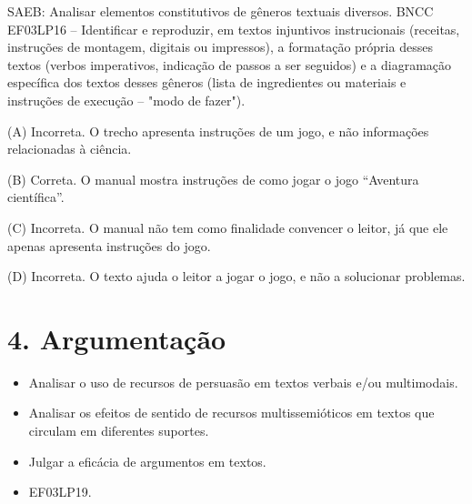 SAEB: Analisar elementos constitutivos de gêneros textuais diversos.
BNCC EF03LP16 -- Identificar e reproduzir, em textos injuntivos
instrucionais (receitas, instruções de montagem, digitais ou impressos),
a formatação própria desses textos (verbos imperativos, indicação de
passos a ser seguidos) e a diagramação específica dos textos desses
gêneros (lista de ingredientes ou materiais e instruções de execução --
"modo de fazer").

(A) Incorreta. O trecho apresenta instruções de um jogo, e não
informações relacionadas à ciência.

(B) Correta. O manual mostra instruções de como jogar o jogo ``Aventura
científica''.

(C) Incorreta. O manual não tem como finalidade convencer o leitor, já
que ele apenas apresenta instruções do jogo.

(D) Incorreta. O texto ajuda o leitor a jogar o jogo, e não a solucionar
problemas.

\section{4. Argumentação}\label{muxf3dulo-4}



\begin{itemize}
  \item Analisar o uso de recursos de persuasão em textos verbais e/ou
multimodais.
  \item Analisar os efeitos de sentido de recursos multissemióticos em
textos que circulam em diferentes suportes.
  \item Julgar a eficácia de argumentos em textos.
\end{itemize}


\begin{itemize}
  \item EF03LP19.
\end{itemize}

